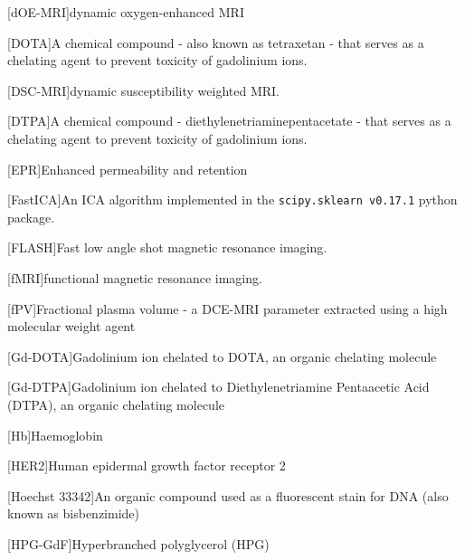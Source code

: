 \begin{acronym}
[dOE-MRI]{dynamic oxygen-enhanced MRI}%

[DOTA]{A chemical compound - also known as tetraxetan - that serves as a chelating agent to prevent toxicity of gadolinium ions.}

[DSC-MRI]{dynamic susceptibility weighted MRI.}

[DTPA]{A chemical compound - diethylenetriaminepentacetate - that serves as a chelating agent to prevent toxicity of gadolinium ions.}

[EPR]{Enhanced permeability and retention}%

[FastICA]{An ICA algorithm implemented in the \texttt{scipy.sklearn v0.17.1} python package.}

[FLASH]{Fast low angle shot magnetic resonance imaging.}

[fMRI]{functional magnetic resonance imaging.}

[fPV]{Fractional plasma volume - a DCE-MRI parameter extracted using a high molecular weight agent}

[Gd-DOTA]{Gadolinium ion chelated to DOTA, an organic chelating molecule}

[Gd-DTPA]{Gadolinium ion chelated to Diethylenetriamine Pentaacetic Acid (DTPA), an organic chelating molecule}%

[Hb]{Haemoglobin}

[HER2]{Human epidermal growth factor receptor 2}

[Hoechst 33342]{An organic compound used as a fluorescent stain for DNA (also known as bisbenzimide)}

[HPG-GdF]{Hyperbranched polyglycerol (HPG)}%


\end{acronym}
